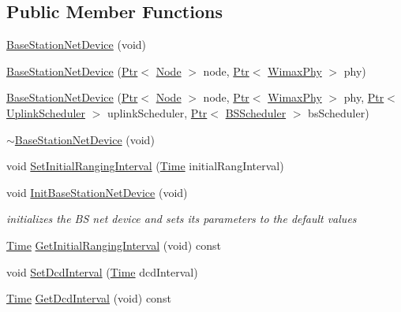 \subsection*{Public Member Functions}
\begin{DoxyCompactItemize}
\item 
\hyperlink{classns3_1_1BaseStationNetDevice_a407f0e1a3bde6e56b31cfafef15cd2ac}{Base\+Station\+Net\+Device} (void)
\item 
\hyperlink{classns3_1_1BaseStationNetDevice_a1d162cf132c74acf3bc9c2e87c7afa01}{Base\+Station\+Net\+Device} (\hyperlink{classns3_1_1Ptr}{Ptr}$<$ \hyperlink{classns3_1_1Node}{Node} $>$ node, \hyperlink{classns3_1_1Ptr}{Ptr}$<$ \hyperlink{classns3_1_1WimaxPhy}{Wimax\+Phy} $>$ phy)
\item 
\hyperlink{classns3_1_1BaseStationNetDevice_a47e9f45b50dd2283d9743ebb31abf95a}{Base\+Station\+Net\+Device} (\hyperlink{classns3_1_1Ptr}{Ptr}$<$ \hyperlink{classns3_1_1Node}{Node} $>$ node, \hyperlink{classns3_1_1Ptr}{Ptr}$<$ \hyperlink{classns3_1_1WimaxPhy}{Wimax\+Phy} $>$ phy, \hyperlink{classns3_1_1Ptr}{Ptr}$<$ \hyperlink{classns3_1_1UplinkScheduler}{Uplink\+Scheduler} $>$ uplink\+Scheduler, \hyperlink{classns3_1_1Ptr}{Ptr}$<$ \hyperlink{classns3_1_1BSScheduler}{B\+S\+Scheduler} $>$ bs\+Scheduler)
\item 
\hyperlink{classns3_1_1BaseStationNetDevice_aa91de73a3643df5ceb73e04a6962b283}{$\sim$\+Base\+Station\+Net\+Device} (void)
\item 
void \hyperlink{classns3_1_1BaseStationNetDevice_a82cfe5c55fc8ba6cea038075e0b6d845}{Set\+Initial\+Ranging\+Interval} (\hyperlink{classns3_1_1Time}{Time} initial\+Rang\+Interval)
\item 
void \hyperlink{classns3_1_1BaseStationNetDevice_a26fd7b4b847fabe35297df4a70d4858a}{Init\+Base\+Station\+Net\+Device} (void)
\begin{DoxyCompactList}\small\item\em initializes the BS net device and sets its parameters to the default values \end{DoxyCompactList}\item 
\hyperlink{classns3_1_1Time}{Time} \hyperlink{classns3_1_1BaseStationNetDevice_a8486dcfd2a7acf13596532d01a155f2c}{Get\+Initial\+Ranging\+Interval} (void) const 
\item 
void \hyperlink{classns3_1_1BaseStationNetDevice_a092f0cbfa19478d241d3bb69926400ff}{Set\+Dcd\+Interval} (\hyperlink{classns3_1_1Time}{Time} dcd\+Interval)
\item 
\hyperlink{classns3_1_1Time}{Time} \hyperlink{classns3_1_1BaseStationNetDevice_aae555330aa8c0b5398b247168419912b}{Get\+Dcd\+Interval} (void) const 

\end{DoxyCompactItemize}
